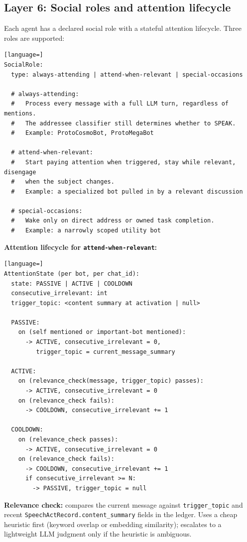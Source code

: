 \documentclass[11pt]{article}
\begin{document}
\subsection{Layer 6: Social roles and attention lifecycle}
\label{sec:social-roles}

Each agent has a declared social role with a stateful attention lifecycle.
Three roles are supported:

\begin{lstlisting}[language=]
SocialRole:
  type: always-attending | attend-when-relevant | special-occasions

  # always-attending:
  #   Process every message with a full LLM turn, regardless of mentions.
  #   The addressee classifier still determines whether to SPEAK.
  #   Example: ProtoCosmoBot, ProtoMegaBot

  # attend-when-relevant:
  #   Start paying attention when triggered, stay while relevant, disengage
  #   when the subject changes.
  #   Example: a specialized bot pulled in by a relevant discussion

  # special-occasions:
  #   Wake only on direct address or owned task completion.
  #   Example: a narrowly scoped utility bot
\end{lstlisting}

\textbf{Attention lifecycle for \texttt{attend-when-relevant}:}

\begin{lstlisting}[language=]
AttentionState (per bot, per chat_id):
  state: PASSIVE | ACTIVE | COOLDOWN
  consecutive_irrelevant: int
  trigger_topic: <content summary at activation | null>

  PASSIVE:
    on (self mentioned or important-bot mentioned):
      -> ACTIVE, consecutive_irrelevant = 0,
         trigger_topic = current_message_summary

  ACTIVE:
    on (relevance_check(message, trigger_topic) passes):
      -> ACTIVE, consecutive_irrelevant = 0
    on (relevance_check fails):
      -> COOLDOWN, consecutive_irrelevant += 1

  COOLDOWN:
    on (relevance_check passes):
      -> ACTIVE, consecutive_irrelevant = 0
    on (relevance_check fails):
      -> COOLDOWN, consecutive_irrelevant += 1
      if consecutive_irrelevant >= N:
        -> PASSIVE, trigger_topic = null
\end{lstlisting}

\textbf{Relevance check:} compares the current message against
\texttt{trigger\_topic} and recent \texttt{SpeechActRecord.content\_summary}
fields in the ledger.  Uses a cheap heuristic first (keyword overlap or embedding
similarity); escalates to a lightweight LLM judgment only if the heuristic is
ambiguous.
\end{document}
